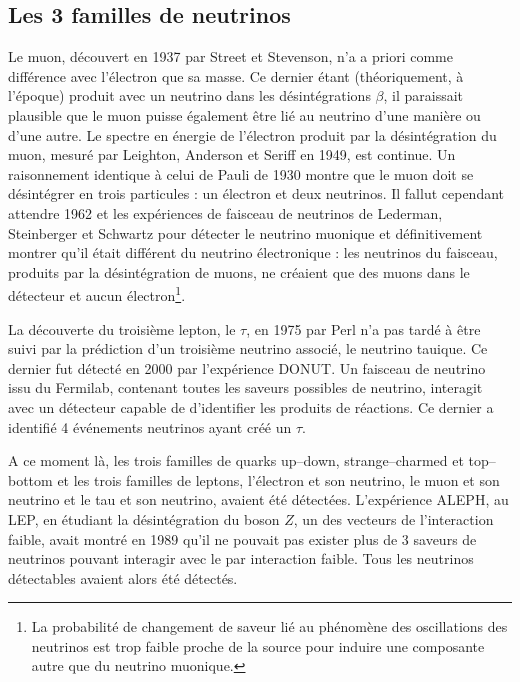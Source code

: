 		\subsection{Les 3 familles de neutrinos}
		
			Le muon, découvert en 1937 par Street et Stevenson\cite{Street1937}, n'a a priori comme différence avec l'électron que sa masse. Ce dernier étant (théoriquement, à l'époque) produit avec un neutrino dans les désintégrations $\beta$, il paraissait plausible que le muon puisse également être lié au neutrino d'une manière ou d'une autre.  Le spectre en énergie de l'électron produit par la désintégration du muon, mesuré par Leighton, Anderson et Seriff en 1949\cite{Leighton1949}, est continue. Un raisonnement identique à celui de Pauli de 1930 montre que le muon doit se désintégrer en trois particules : un électron et deux neutrinos. Il fallut cependant attendre 1962 et les expériences de faisceau de neutrinos de Lederman, Steinberger et Schwartz\cite{Danby1962} pour détecter le neutrino muonique et définitivement montrer qu'il était différent du neutrino électronique : les neutrinos du faisceau, produits par la désintégration de muons, ne créaient que des muons dans le détecteur et aucun électron\footnote{La probabilité  de changement de saveur lié au phénomène des oscillations des neutrinos est trop faible proche de la source pour induire une composante autre que du neutrino muonique.}.
			
			La découverte du troisième lepton, le $\tau$, en 1975 par Perl\cite{Perl1975} n'a pas tardé à être suivi par la prédiction d'un troisième neutrino associé, le neutrino tauique. Ce dernier fut détecté en 2000 par l'expérience DONUT\cite{Collaboration2000}. Un faisceau de neutrino issu du Fermilab, contenant toutes les saveurs possibles de neutrino, interagit avec un détecteur capable de d'identifier les produits de réactions. Ce dernier a identifié 4 événements neutrinos ayant créé un $\tau$.
			
			A ce moment là, les trois familles de quarks up--down, strange--charmed et top--bottom et les trois familles de leptons, l'électron et son neutrino, le muon et son neutrino et le tau et son neutrino, avaient été détectées. L'expérience ALEPH, au LEP, en étudiant la désintégration du boson $Z$, un des vecteurs de l'interaction faible, avait montré en 1989 qu'il ne pouvait pas exister plus de 3 saveurs de neutrinos pouvant interagir avec le par interaction faible\cite{DeCamp1989}. Tous les neutrinos détectables avaient alors été détectés.
		    
